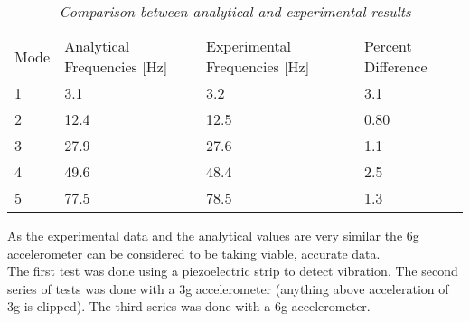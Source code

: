\begin{table}
\begin{center}
    \begin{tabular}{llll}
    Mode & Analytical Frequencies [Hz] & Experimental Frequencies [Hz] & Percent Difference \\
    1    & 3.1                         & 3.2                           & 3.1                \\
    2    & 12.4                        & 12.5                          & 0.80               \\
    3    & 27.9                        & 27.6                          & 1.1                \\
    4    & 49.6                        & 48.4                          & 2.5                \\
    5    & 77.5                        & 78.5                          & 1.3                \\
    \end{tabular}
    \caption{\textit{Comparison between analytical and experimental results}}
    \label{tab:ExperimentalvsAnalytical}
\end{center}
\end{table}

As the experimental data and the analytical values are very similar the 6g accelerometer can be considered to be taking viable, accurate data.\\






The first test was done using a piezoelectric strip to detect vibration. The second series of tests was done with a 3g accelerometer (anything above acceleration of 3g is clipped). The third series was done with a 6g accelerometer.
